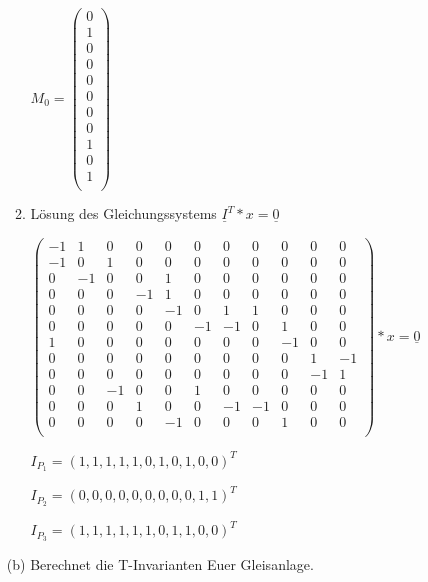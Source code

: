 \documentclass{scrreprt}
\begin{document}
\begin{enumerate}
\begin{enumerate}
\( M_0 = \begin{pmatrix}
0 \\ %
1 \\ %
0 \\ %
0 \\ %
0 \\ %
0 \\ %
0 \\ %
0 \\ %
1 \\ %
0 \\ %
1 \\ %
\end{pmatrix} \)

\item Lösung des Gleichungssystems \( \underline{I}^T * x = \underline{0} \)

\( \begin{pmatrix}
-1 & 1 & 0 & 0 & 0 & 0 & 0 & 0 & 0 & 0 & 0  \\
-1 & 0 & 1 & 0 & 0 & 0 & 0 & 0 & 0 & 0 & 0  \\
 0 &-1 & 0 & 0 & 1 & 0 & 0 & 0 & 0 & 0 & 0  \\
 0 & 0 & 0 &-1 & 1 & 0 & 0 & 0 & 0 & 0 & 0  \\
 0 & 0 & 0 & 0 &-1 & 0 & 1 & 1 & 0 & 0 & 0  \\
 0 & 0 & 0 & 0 & 0 &-1 &-1 & 0 & 1 & 0 & 0  \\
 1 & 0 & 0 & 0 & 0 & 0 & 0 & 0 &-1 & 0 & 0  \\
 0 & 0 & 0 & 0 & 0 & 0 & 0 & 0 & 0 & 1 &-1  \\
 0 & 0 & 0 & 0 & 0 & 0 & 0 & 0 & 0 &-1 & 1  \\
 0 & 0 &-1 & 0 & 0 & 1 & 0 & 0 & 0 & 0 & 0  \\
 0 & 0 & 0 & 1 & 0 & 0 &-1 &-1 & 0 & 0 & 0  \\
 0 & 0 & 0 & 0 &-1 & 0 & 0 & 0 & 1 & 0 & 0  \\
\end{pmatrix} * x = \underline{0}\)


$I_{P_1} = (1, 1, 1, 1, 1, 0, 1, 0, 1, 0, 0)^T$

$I_{P_2} = (0, 0, 0, 0, 0, 0, 0, 0, 0, 1, 1)^T$

$I_{P_3} = (1, 1, 1, 1, 1, 1, 0, 1, 1, 0, 0)^T$

\end{enumerate}

(b) Berechnet die T-Invarianten Euer Gleisanlage.


\end{enumerate}
\end{document}

